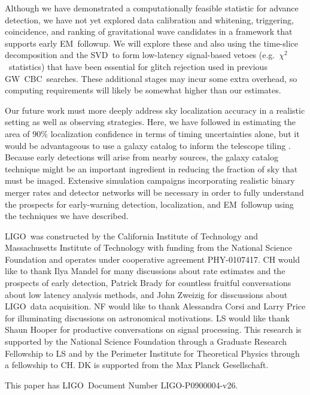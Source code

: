 \documentclass[preprint2]{aastex}
\newcommand{\GW}{GW}%
\newcommand{\EM}{EM}%
\newcommand{\CBC}{CBC}%
\newcommand{\LIGO}{LIGO}%
\newcommand{\SVD}{SVD}%
\begin{document}
Although we have demonstrated a computationally feasible statistic
for advance detection, we have not yet explored data calibration and whitening,
triggering, coincidence, and ranking of gravitational wave candidates in a
framework that supports early \EM\ followup.  We will explore these and also
using the time-slice decomposition and the \SVD\ to form low-latency
signal-based vetoes (e.g.~$\chi^2$~statistics) that have been essential for
glitch rejection used in previous \GW\ \CBC\ searches.  These additional stages
may incur some extra overhead, so computing requirements will likely be somewhat
higher than our estimates.

Our future work must more deeply address sky localization accuracy in a
realistic setting as well as observing strategies. Here, we have followed
\citet{Fairhurst2009} in estimating the area of 90\% localization confidence in
terms of timing uncertainties alone, but it would be advantageous to use a
galaxy catalog to inform the telescope tiling \citep{galaxy-catalog}. Because
early detections will arise from nearby sources, the galaxy catalog technique
might be an important ingredient in reducing the fraction of sky that must be
imaged.  Extensive simulation campaigns incorporating realistic binary merger
rates and detector networks will be necessary in order to fully understand the
prospects for early-warning detection, localization, and \EM\ followup using
the techniques we have described.

\acknowledgements

\LIGO\ was constructed by the California Institute of Technology and
Massachusetts Institute of Technology with funding from the National Science
Foundation and operates under cooperative agreement PHY-0107417.  CH would like
to thank Ilya Mandel for many discussions about rate estimates and the prospects
of early detection, Patrick Brady for countless fruitful conversations about low
latency analysis methods, and John Zweizig for disscussions about \LIGO\ data
acquisition.  NF would like to thank Alessandra Corsi and Larry Price for
illuminating discussions on astronomical motivations.  LS would like thank Shaun
Hooper for productive conversations on signal processing.  This research is
supported by the National Science Foundation through a Graduate Research
Fellowship to LS and by the Perimeter Institute for Theoretical Physics through
a fellowship to CH. DK is supported from the Max Planck Gesellschaft. 

This paper has \LIGO\ Document Number {LIGO-P0900004-v26}.



\end{document}
